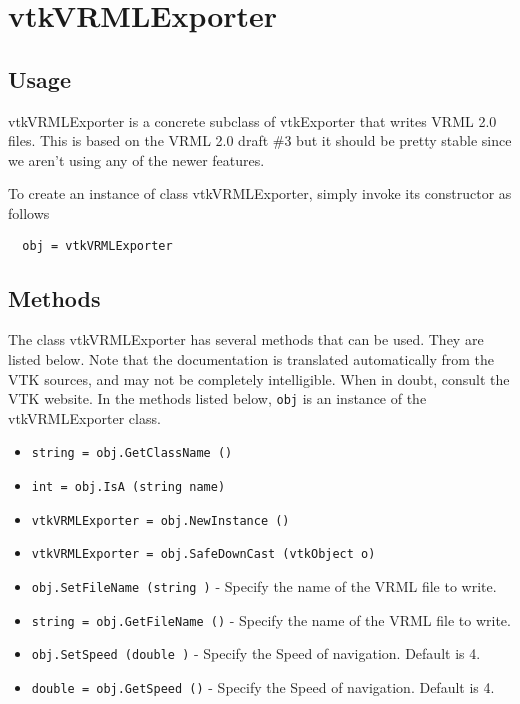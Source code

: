\section{vtkVRMLExporter}

\subsection{Usage}

 vtkVRMLExporter is a concrete subclass of vtkExporter that writes VRML 2.0
 files. This is based on the VRML 2.0 draft \#3 but it should be pretty
 stable since we aren't using any of the newer features.


To create an instance of class vtkVRMLExporter, simply
invoke its constructor as follows
\begin{verbatim}
  obj = vtkVRMLExporter
\end{verbatim}
\subsection{Methods}

The class vtkVRMLExporter has several methods that can be used.
  They are listed below.
Note that the documentation is translated automatically from the VTK sources,
and may not be completely intelligible.  When in doubt, consult the VTK website.
In the methods listed below, \verb|obj| is an instance of the vtkVRMLExporter class.
\begin{itemize}
\item  \verb|string = obj.GetClassName ()|

\item  \verb|int = obj.IsA (string name)|

\item  \verb|vtkVRMLExporter = obj.NewInstance ()|

\item  \verb|vtkVRMLExporter = obj.SafeDownCast (vtkObject o)|

\item  \verb|obj.SetFileName (string )| -  Specify the name of the VRML file to write.

\item  \verb|string = obj.GetFileName ()| -  Specify the name of the VRML file to write.

\item  \verb|obj.SetSpeed (double )| -  Specify the Speed of navigation. Default is 4.

\item  \verb|double = obj.GetSpeed ()| -  Specify the Speed of navigation. Default is 4.

\end{itemize}
